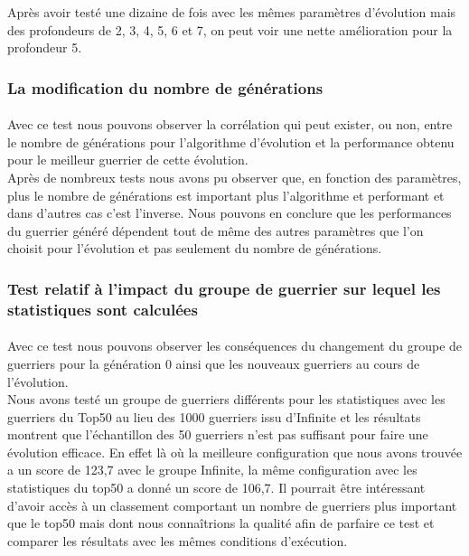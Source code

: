 \documentclass[french]{article}
\begin{document}
            \bigskip
            Après avoir testé une dizaine de fois avec les mêmes paramètres d'évolution mais des profondeurs de 2, 3, 4, 5, 6 et 7, on peut voir une nette amélioration pour la profondeur 5.\\
            
        \subsubsection{La modification du nombre de générations}
            \paragraph{} Avec ce test nous pouvons observer la corrélation qui peut exister, ou non, entre le nombre de générations pour l'algorithme d'évolution et la performance obtenu pour le meilleur guerrier de cette évolution. \\
            Après de nombreux tests nous avons pu observer que, en fonction des paramètres, plus le nombre de générations est important plus l'algorithme et performant et dans d'autres cas c'est l'inverse. Nous pouvons en conclure que les performances du guerrier généré dépendent tout de même des autres paramètres que l'on choisit pour l'évolution et pas seulement du nombre de générations.\\
            
        \subsubsection{Test relatif à l'impact du groupe de guerrier sur lequel les statistiques sont calculées}
            \paragraph{} Avec ce test nous pouvons observer les conséquences du changement du groupe de guerriers pour la génération 0 ainsi que les nouveaux guerriers au cours de l'évolution. \\
            Nous avons testé un groupe de guerriers différents pour les statistiques avec les guerriers du Top50 au lieu des 1000 guerriers issu d'Infinite et les résultats montrent que l'échantillon des 50 guerriers n'est pas suffisant pour faire une évolution efficace. En effet là où la meilleure configuration que nous avons trouvée a un score de 123,7 avec le groupe Infinite, la même configuration avec les statistiques du top50 a donné un score de 106,7. Il pourrait être intéressant d'avoir accès à un classement comportant un nombre de guerriers plus important que le top50 mais dont nous connaîtrions la qualité afin de parfaire ce test et comparer les résultats avec les mêmes conditions d'exécution.
\end{document}
